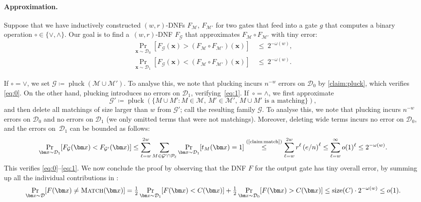 \documentclass[11pt]{article}
\theoremstyle{plain}
\theoremstyle{definition}
\theoremstyle{remark}
\DeclareMathOperator{\pluck}{pluck}
\newcommand{\PM}{\textsc{Match}}
\def\cald{{\mathcal D}}
\def\calg{{\mathcal G}}
\def\calm{{\mathcal M}}
\def\calp{{\mathcal P}}
\begin{document}
\paragraph{Approximation.}
Suppose 
that we have inductively constructed $(w,r)$-DNFs $F_{\calm}$, $F_{\calm'}$ for two gates that feed into a gate $g$ that computes a binary operation $\circ\in\{\lor,\land\}$. Our goal is to find a~$(w,r)$-DNF $F_{\calg}$ that approximates $F_{\calm}\circ F_{\calm'}$ with  tiny error:
\begin{align}
\textstyle \Pr_{\bm x \sim\cald_0}[F_\calg(\bm x) > (F_{\calm}\circ F_{\calm'})(\bm x)] &~\leq~ 2^{-\omega(w)}, \label{eq:0} \\
\textstyle \Pr_{\bm x \sim\cald_1}[F_\calg(\bm x) < (F_{\calm}\circ F_{\calm'})(\bm x)] &~\leq~ 2^{-\omega(w)}. \label{eq:1} 
\end{align}

If $\circ=\lor$, we set $\calg\coloneqq\pluck(\calm \cup \calm')$. To analyse this, we note that plucking incurs $n^{-w}$ errors on $\cald_0$ by \cref{claim:pluck}, which verifies \eqref{eq:0}. On the other hand, plucking introduces no errors on $\cald_1$, verifying~\eqref{eq:1}. If~$\circ=\land$, we first approximate
\begin{equation*}
    \calg' \coloneqq 
    \pluck
    \left(
    \{ M \cup M' : M \in \calm,\, M' \in \calm',\,
    M \cup M' \text{ is a matching}
    \}
\right),
\end{equation*}
and then delete all matchings of size larger than $w$ from $\calg'$; call the resulting family $\calg$.
To analyse this, we note that plucking incurs $n^{-w}$ errors on $\cald_0$
and no errors on $\cald_1$ (we only omitted terms that were not matchings).
Moreover,
deleting wide terms incurs no error on $\cald_0$, 
and the errors on~$\cald_1$ can be bounded as follows:
\begin{equation*}
\Pr_{\bm x\sim\cald_1}[F_{\calg}(\bm x) < F_{\calg'}(\bm x)]
\leq
    \sum_{\ell = w}^{2w} 
    \sum_{M\in\calg'\cap\calp_\ell}\Pr_{\bm x\sim\cald_1}[t_M(\bm x)=1] 
    \stackrel{\text{(\cref{claim:match})}}{\leq}
    \sum_{\ell = w}^{2w} 
    r^\ell \left( e/n \right)^\ell 
    \leq
    \sum_{\ell = w}^{\infty} 
    o(1)^\ell
    \leq
    2^{-\omega(w)}.
\end{equation*}
This verifies \eqref{eq:0}--\eqref{eq:1}. We now conclude the proof by observing that the DNF $F$ for the output gate has tiny overall error, by summing up all the individual contributions in :
\begin{align*}
    \Pr_{\bm x \sim \cald}[F(\bm x) \neq \PM(\bm x)]
    =
    {\textstyle\frac{1}{2}}
    \Pr_{\bm x \sim \cald_1}[F(\bm x)<C(\bm x)] 
    + 
    {\textstyle\frac{1}{2}}
    \Pr_{\bm x \sim \cald_0}[F(\bm x)>C(\bm x)] 
    \le 
    \operatorname{size}(C)\cdot 2^{-\omega(w)}
    \le 
    o(1).
\end{align*}
\end{document}
